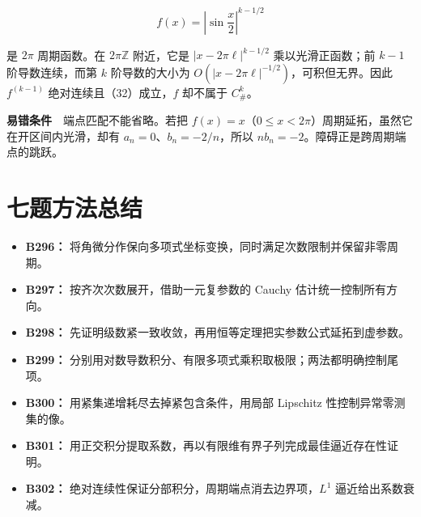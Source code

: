 \documentclass[11pt,a4paper]{article}
\providecommand{\tightlist}{\setlength{\itemsep}{3pt}\setlength{\parskip}{0pt}}
\begin{document}
\begin{equation}
f(x)=\left|\sin\frac x2\right|^{k-1/2}
\tag{37}
\end{equation}

是 \(2\pi\) 周期函数。在 \(2\pi\mathbb Z\) 附近，它是
\(|x-2\pi\ell|^{k-1/2}\) 乘以光滑正函数；前 \(k-1\) 阶导数连续，而第
\(k\) 阶导数的大小为 \(O(|x-2\pi\ell|^{-1/2})\)，可积但无界。因此
\(f^{(k-1)}\) 绝对连续且（32）成立，\(f\) 却不属于 \(C_\#^k\)。

\textbf{易错条件}　端点匹配不能省略。若把
\(f(x)=x\)（\(0\le x<2\pi\)）周期延拓，虽然它在开区间内光滑，却有
\(a_n=0\)、\(b_n=-2/n\)，所以 \(nb_n=-2\)。障碍正是跨周期端点的跳跃。

\section{七题方法总结}\label{ux4e03ux9898ux65b9ux6cd5ux603bux7ed3}

\begin{itemize}
\tightlist
\item
  \textbf{B296：}
  将角微分作保向多项式坐标变换，同时满足次数限制并保留非零周期。
\item
  \textbf{B297：} 按齐次次数展开，借助一元复参数的 Cauchy
  估计统一控制所有方向。
\item
  \textbf{B298：}
  先证明级数紧一致收敛，再用恒等定理把实参数公式延拓到虚参数。
\item
  \textbf{B299：}
  分别用对数导数积分、有限多项式乘积取极限；两法都明确控制尾项。
\item
  \textbf{B300：} 用紧集递增耗尽去掉紧包含条件，用局部 Lipschitz
  性控制异常零测集的像。
\item
  \textbf{B301：}
  用正交积分提取系数，再以有限维有界子列完成最佳逼近存在性证明。
\item
  \textbf{B302：} 绝对连续性保证分部积分，周期端点消去边界项，\(L^1\)
  逼近给出系数衰减。
\end{itemize}
\end{document}
